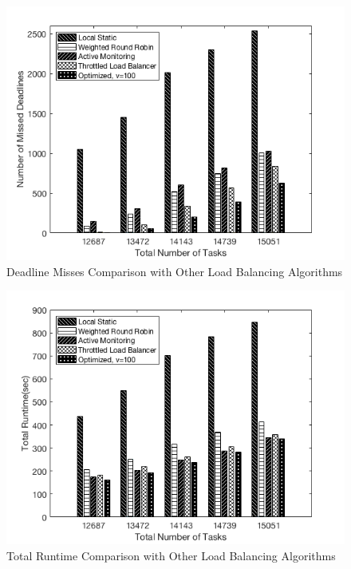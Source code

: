  
\begin{figure}[ht!]
\centering
\includegraphics[width=1\linewidth]{images/res_opt_vs_lb_ls_mdp}
\caption{Deadline Misses Comparison with Other Load Balancing Algorithms}
\label{res_opt_vs_lb_ls_md}
\end{figure}


\begin{figure}[ht!]
\centering
\includegraphics[width=1\linewidth]{images/res_opt_vs_lb_ls_timep}
\caption{Total Runtime Comparison with Other Load Balancing Algorithms}
\label{res_opt_vs_lb_ls_time}
\end{figure}


